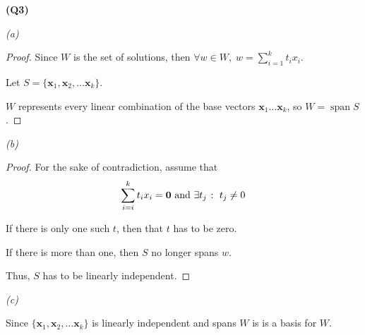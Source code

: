 \documentclass[12pt, a4paper]{article}
\begin{document}
\textbf{(Q3)}

\textit{(a)}

\begin{proof}
    Since $W$ is the set of solutions, then
    $\forall w \in W, \; w = \sum_{i = 1}^{k} t_ix_i$.

    Let $S = \{\mathbf{x}_1, \mathbf{x}_2,\ldots \mathbf{x}_k\}$.

    $W$ represents every linear combination of the base vectors
    $\mathbf{x}_1 \ldots \mathbf{x}_k$, so $W = \operatorname{span} S$.
\end{proof}

\textit{(b)}

\begin{proof}
    For the sake of contradiction, assume that
    \[
        \sum_{i = i}^{k} t_ix_i = \mathbf{0} \text{ and }
        \exists t_j \; \colon \; t_j \neq 0
    \]

    If there is only one such $t$, then that $t$ has to be zero.

    If there is more than one, then $S$ no longer spans $w$.

    Thus, $S$ has to be linearly independent.
\end{proof}

\textit{(c)}

Since $\{\mathbf{x}_1, \mathbf{x}_2,\ldots \mathbf{x}_k\}$ is linearly
independent and spans $W$ is is a basis for $W$.
\end{document}
